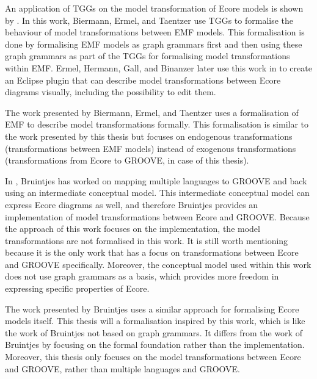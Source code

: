An application of TGGs on the model transformation of Ecore models is shown by \cite{biermann_ermel_taentzer_2011}. In this work, Biermann, Ermel, and Taentzer use TGGs to formalise the behaviour of model transformations between EMF models. This formalisation is done by formalising EMF models as graph grammars first and then using these graph grammars as part of the TGGs for formalising model transformations within EMF. Ermel, Hermann, Gall, and Binanzer later use this work in \cite{ermel-visual_analysis} to create an Eclipse plugin that can describe model transformations between Ecore diagrams visually, including the possibility to edit them.

The work presented by Biermann, Ermel, and Taentzer uses a formalisation of EMF to describe model transformations formally. This formalisation is similar to the work presented by this thesis but focuses on endogenous transformations (transformations between EMF models) instead of exogenous transformations (transformations from Ecore to GROOVE, in case of this thesis).

In \cite{bruintjes_bridging-groove}, Bruintjes has worked on mapping multiple languages to GROOVE and back using an intermediate conceptual model. This intermediate conceptual model can express Ecore diagrams as well, and therefore Bruintjes provides an implementation of model transformations between Ecore and GROOVE. Because the approach of this work focuses on the implementation, the model transformations are not formalised in this work. It is still worth mentioning because it is the only work that has a focus on transformations between Ecore and GROOVE specifically. Moreover, the conceptual model used within this work does not use graph grammars as a basis, which provides more freedom in expressing specific properties of Ecore.

The work presented by Bruintjes uses a similar approach for formalising Ecore models itself. This thesis will a formalisation inspired by this work, which is like the work of Bruintjes not based on graph grammars. It differs from the work of Bruintjes by focusing on the formal foundation rather than the implementation. Moreover, this thesis only focuses on the model transformations between Ecore and GROOVE, rather than multiple languages and GROOVE.